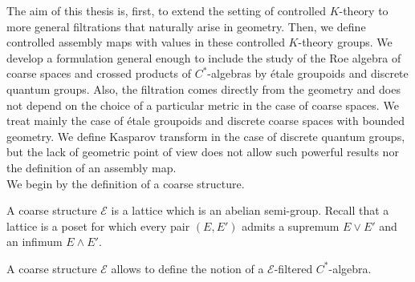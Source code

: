 

The aim of this thesis is, first, to extend the setting of controlled $K$-theory to more general filtrations that naturally arise in geometry. Then, we define controlled assembly maps with values in these controlled $K$-theory groups. We develop a formulation general enough to include the study of the Roe algebra of coarse spaces and crossed products of $C^*$-algebras by étale groupoids and discrete quantum groups. Also, the filtration comes directly from the geometry and does not depend on the choice of a particular metric in the case of coarse spaces. We treat mainly the case of étale groupoids and discrete coarse spaces with bounded geometry. We define Kasparov transform in the case of discrete quantum groups, but the lack of geometric point of view does not allow such powerful results nor the definition of an assembly map. \\

We begin by the definition of a coarse structure. 

\begin{definition}
A coarse structure $\mathcal E$ is a lattice which is an abelian semi-group. %
Recall that a lattice is a poset for which every pair $(E,E')$ admits a supremum $E\vee E'$ and an infimum $E\wedge E'$.
\end{definition}

A coarse structure $\mathcal E$ allows to define the notion of a $\mathcal E$-filtered $C^*$-algebra. 


